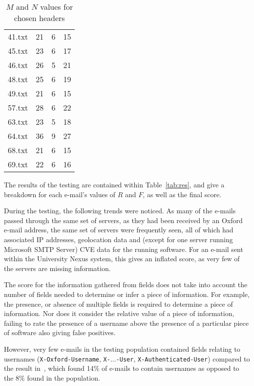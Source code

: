 \begin{table}
\begin{tabular}{@{}cccc@{}}
41.txt & 21           & 6                     & 15                 \\
45.txt & 23           & 6                     & 17                 \\
46.txt & 26           & 5                     & 21                 \\
48.txt & 25           & 6                     & 19                 \\
49.txt & 21           & 6                     & 15                 \\
57.txt & 28           & 6                     & 22                 \\
63.txt & 23           & 5                     & 18                 \\
64.txt & 36           & 9                     & 27                 \\
68.txt & 21           & 6                     & 15                 \\
69.txt & 22           & 6                     & 16                 \\
\bottomrule
\end{tabular}
\caption{$M$ and $N$ values for chosen headers}
\label{tab:sammn}
\end{table}

The results of the testing are contained within Table~\ref{tab:res}, and give a breakdown for each e-mail's values of $R$ and $F$, as well as the final score.

During the testing, the following trends were noticed.  As many of the e-mails passed through the same set of servers, as they had been received by an Oxford e-mail address, the same set of servers were frequently seen, all of which had associated IP addresses, geolocation data and (except for one server running Microsoft SMTP Server) CVE data for the running software.  For an e-mail sent within the University Nexus system, this gives an inflated score, as very few of the servers are missing information.

	The score for the information gathered from fields does not take into account the number of fields needed to determine or infer a piece of information. For example, the presence, or absence of multiple fields is required to determine a piece of information.  Nor does it consider the relative value of a piece of information, failing to rate the presence of a username above the presence of a particular piece of software also giving false positives.

	However, very few e-mails in the testing population contained fields relating to usernames (\texttt{X-Oxford-Username}, \texttt{X-}$\ldots$\texttt{-User}, \texttt{X-Authenticated-User}) compared to the result in~\cite{nurse2015investigating}, which found 14\% of e-mails to contain usernames as opposed to the 8\% found in the population.
